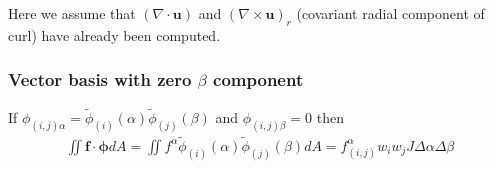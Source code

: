 \documentclass{article}
\newcommand{\vb}{\mathbf}
\begin{document}
Here we assume that $(\nabla \cdot \vb{u})$ and $(\nabla \times \vb{u})_r$ (covariant radial component of curl) have already been computed.

\subsubsection{Vector basis with zero $\beta$ component}

If $\phi_{(i,j) \alpha} = \tilde{\phi}_{(i)}(\alpha) \tilde{\phi}_{(j)}(\beta)$ and $\phi_{(i,j) \beta} = 0$ then
\begin{align} \label{eq:VecHyperviscosityZeroBetaLHS}
\iint \vb{f} \cdot \vb{\phi} dA = \iint f^\alpha \tilde{\phi}_{(i)}(\alpha) \tilde{\phi}_{(j)}(\beta) dA = f^\alpha_{(i,j)} w_i w_j J \Delta \alpha \Delta \beta
\end{align}
\end{document}

